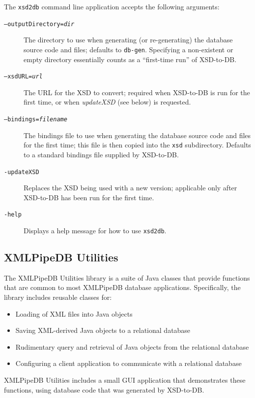 \documentclass[11pt]{article}
\begin{document}
The \texttt{xsd2db} command line application accepts the following arguments:
\begin{description}
\item[\texttt{--outputDirectory=\emph{dir}}] The directory to use when generating (or re-generating) the database source code and files; defaults to \texttt{db-gen}.  Specifying a non-existent or empty directory essentially counts as a ``first-time run'' of XSD-to-DB.

\item[\texttt{--xsdURL=\emph{url}}] The URL for the XSD to convert; required when XSD-to-DB is run for the first time, or when \emph{updateXSD} (see below) is requested.

\item[\texttt{--bindings=\emph{filename}}] The bindings file to use when generating the database source code and files for the first time; this file is then copied into the \texttt{xsd} subdirectory.  Defaults to a standard bindings file supplied by XSD-to-DB.

\item[\texttt{-updateXSD}] Replaces the XSD being used with a new version; applicable only after XSD-to-DB has been run for the first time.

\item[\texttt{-help}] Displays a help message for how to use \texttt{xsd2db}.
\end{description}

\subsection{XMLPipeDB Utilities}
\label{xmlpipedbutils}

The XMLPipeDB Utilities library is a suite of Java classes that provide functions that are common to most XMLPipeDB database applications.  Specifically, the library includes reusable classes for:
\begin{itemize}
\item Loading of XML files into Java objects
\item Saving XML-derived Java objects to a relational database
\item Rudimentary query and retrieval of Java objects from the relational database
\item Configuring a client application to communicate with a relational database
\end{itemize}
XMLPipeDB Utilities includes a small GUI application that demonstrates these functions, using database code that was generated by XSD-to-DB.
\end{document}
